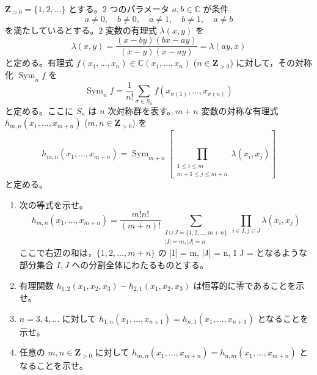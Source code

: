 \documentclass[12pt]{jlreq}
\begin{document}
$\mathbf{Z}_{>0} = \{1, 2, \dots\}$ とする。$2$ つのパラメータ $a, b \in \mathbb{C}$ が条件
\[
  a \ne 0,\quad b \ne 0,\quad a \ne 1,\quad b \ne 1,\quad a \ne b
\]
を満たしているとする。$2$ 変数の有理式 $\lambda(x, y)$ を
\[
  \lambda(x, y) = \frac{(x - by)(bx - ay)}{(x - y)(x - ay)} = \lambda(ay, x)
\]
と定める。有理式 $f(x_1, \dots, x_n) \in \mathbb{C}(x_1, \dots, x_n)$ ($n \in \mathbf{Z}_{>0}$) に対して，その対称化 $\operatorname{Sym}_n f$ を
\[
  \operatorname{Sym}_n f = \frac{1}{n!} \sum_{\sigma \in S_n} f(x_{\sigma(1)}, \dots, x_{\sigma(n)})
\]
と定める。ここに $S_n$ は $n$ 次対称群を表す。$m + n$ 変数の対称な有理式 $h_{m,n}(x_1, \dots, x_{m+n})$ ($m, n \in \mathbf{Z}_{>0}$) を
\[
  h_{m,n}(x_1, \dots, x_{m+n}) = \operatorname{Sym}_{m+n} \left[ \prod_{\substack{1 \le i \le m \\ m+1 \le j \le m+n}} \lambda(x_i, x_j) \right]
\]
と定める。

\begin{enumerate}
  \item 次の等式を示せ。
  \[
    h_{m,n}(x_1, \dots, x_{m+n}) = \frac{m!n!}{(m+n)!} \sum_{\substack{I \cup J = \{1, 2, \dots, m+n\} \\ |I| = m, |J| = n}} \prod_{i \in I, j \in J} \lambda(x_i, x_j)
  \]
  ここで右辺の和は，$\{1, 2, \dots, m+n\}$ の |I| = m, |J| = n, I \cap J = \emptyset となるような部分集合 $I, J$ への分割全体にわたるものとする。
  \item 有理関数 $h_{1,2}(x_1, x_2, x_3) - h_{2,1}(x_1, x_2, x_3)$ は恒等的に零であることを示せ。
  \item $n = 3, 4, \dots$ に対して $h_{1,n}(x_1, \dots, x_{n+1}) = h_{n,1}(x_1, \dots, x_{n+1})$ となることを示せ。
  \item 任意の $m, n \in \mathbf{Z}_{>0}$ に対して $h_{m,n}(x_1, \dots, x_{m+n}) = h_{n,m}(x_1, \dots, x_{m+n})$ となることを示せ。
\end{enumerate}
\end{document}
